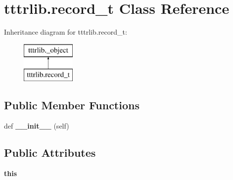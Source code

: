 \hypertarget{classtttrlib_1_1record__t}{}\section{tttrlib.\+record\+\_\+t Class Reference}
\label{classtttrlib_1_1record__t}
Inheritance diagram for tttrlib.\+record\+\_\+t\+:\begin{figure}[H]
\begin{center}
\leavevmode
\includegraphics[height=2.000000cm]{classtttrlib_1_1record__t}
\end{center}
\end{figure}
\subsection*{Public Member Functions}
\begin{DoxyCompactItemize}
\item 
\mbox{\label{classtttrlib_1_1record__t_a89a2a07ab47aed9e07d17b0eff1384e3}} 
def {\bfseries \+\_\+\+\_\+init\+\_\+\+\_\+} (self)
\end{DoxyCompactItemize}
\subsection*{Public Attributes}
\begin{DoxyCompactItemize}
\item 
\mbox{\label{classtttrlib_1_1record__t_aec752840f382ef42df532a27e87e9a7c}} 
{\bfseries this}
\end{DoxyCompactItemize}
